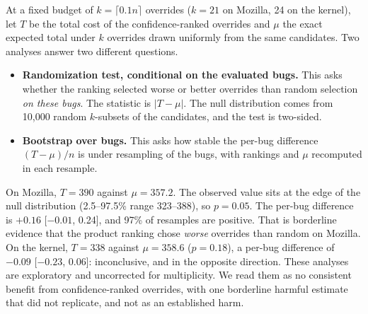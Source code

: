  At a fixed budget of
$k = \lceil 0.1n \rceil$ overrides ($k = 21$ on Mozilla, 24 on the kernel),
let $T$ be the total cost of the confidence-ranked overrides and $\mu$ the
exact expected total under $k$ overrides drawn uniformly from the same
candidates. Two analyses answer two different questions.
\begin{itemize}
  \item \textbf{Randomization test, conditional on the evaluated bugs.}
  This asks whether the ranking selected worse or better overrides than
  random selection \emph{on these bugs}. The statistic is $|T - \mu|$.
  The null distribution comes from 10{,}000 random $k$-subsets of the
  candidates, and the test is two-sided.
  \item \textbf{Bootstrap over bugs.} This asks how stable the per-bug
  difference $(T - \mu)/n$ is under resampling of the bugs, with rankings
  and $\mu$ recomputed in each resample.
\end{itemize}
On Mozilla, $T = 390$ against $\mu = 357.2$. The observed value sits at
the edge of the null distribution (2.5--97.5\% range 323--388), so
$p = 0.05$. The per-bug difference is $+0.16$ [$-0.01$, 0.24], and 97\% of
resamples are positive. That is borderline evidence that the product
ranking chose \emph{worse} overrides than random on Mozilla. On the
kernel, $T = 338$ against $\mu = 358.6$ ($p = 0.18$), a per-bug difference
of $-0.09$ [$-0.23$, 0.06]: inconclusive, and in the opposite direction.
These analyses are exploratory and uncorrected for multiplicity. We read
them as no consistent benefit from confidence-ranked overrides, with one
borderline harmful estimate that did not replicate, and not as an
established harm.




